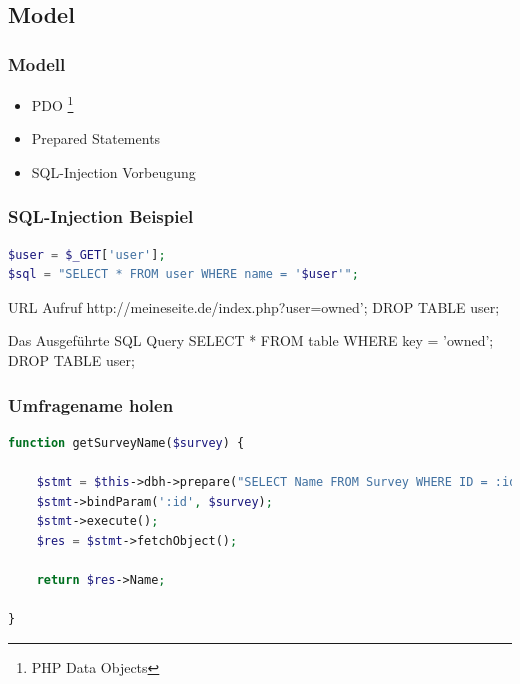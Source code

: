 \documentclass[xcolor=dvipsnames]{beamer}
\begin{document}
\subsection{Model}
\begin{frame} %
  \frametitle{Modell} %
  \begin{block}{}
	  \begin{itemize}
  		\item PDO \footnote{PHP Data Objects}
  		\item Prepared Statements
  		\item SQL-Injection Vorbeugung
	  \end{itemize}
  \end{block} 
\end{frame}

\begin{frame}[fragile] %
  \frametitle{SQL-Injection Beispiel} %

\begin{lstlisting}[language=PHP, caption=PHP Code der nicht Existieren sollte!!]
$user = $_GET['user'];
$sql = "SELECT * FROM user WHERE name = '$user'";
\end{lstlisting} 

\begin{block}{URL Aufruf}
http://meineseite.de/index.php?user=owned'; DROP TABLE user;
\end{block}
 
  \begin{alertblock}{Das Ausgeführte SQL Query}
SELECT * FROM table WHERE key = 'owned'; DROP TABLE user;
	\end{alertblock} 


\end{frame}

\begin{frame}[fragile] %
  \frametitle{Umfragename holen} %

\begin{lstlisting}[language=PHP, caption=getSurveyName Funktion]
function getSurveyName($survey) {
		
    $stmt = $this->dbh->prepare("SELECT Name FROM Survey WHERE ID = :id");
    $stmt->bindParam(':id', $survey);
    $stmt->execute();
    $res = $stmt->fetchObject();

    return $res->Name;
		
}
\end{lstlisting} 
\end{frame}
\end{document}
